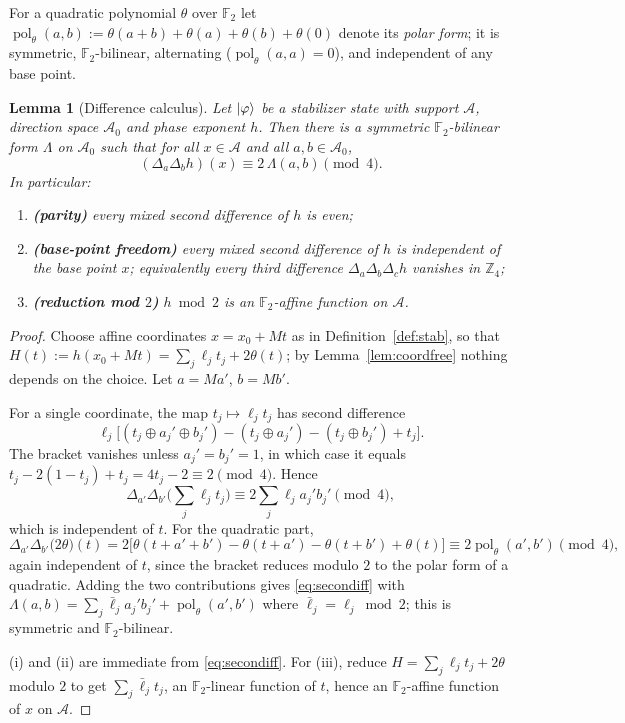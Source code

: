 \documentclass[11pt]{article}
\theoremstyle{plain}
\newtheorem{lemma}[theorem]{Lemma}
\theoremstyle{definition}
\newcommand{\F}{\mathbb{F}}
\newcommand{\Z}{\mathbb{Z}}
\DeclareMathOperator{\pol}{pol}
\begin{document}
For a quadratic polynomial $\theta$ over $\F_2$ let
$\pol_\theta(a,b):=\theta(a+b)+\theta(a)+\theta(b)+\theta(0)$ denote its
\emph{polar form}; it is symmetric, $\F_2$-bilinear, alternating
($\pol_\theta(a,a)=0$), and independent of any base point.

\begin{lemma}[Difference calculus]\label{lem:diff}
Let $\ket\varphi$ be a stabilizer state with support $\mathcal A$, direction space
$\mathcal A_0$ and phase exponent $h$. Then there is a symmetric $\F_2$-bilinear form
$\Lambda$ on $\mathcal A_0$ such that for all $x\in\mathcal A$ and all
$a,b\in\mathcal A_0$,
\begin{equation}\label{eq:secondiff}
(\Delta_a\Delta_bh)(x)\equiv 2\,\Lambda(a,b) \pmod 4 .
\end{equation}
In particular:
\begin{enumerate}[label=(\roman*)]
\item \textbf{(parity)} every mixed second difference of $h$ is even;
\item \textbf{(base-point freedom)} every mixed second difference of $h$ is independent
of the base point $x$; equivalently every third difference
$\Delta_a\Delta_b\Delta_ch$ vanishes in $\Z_4$;
\item \textbf{(reduction mod $2$)} $h\bmod2$ is an $\F_2$-affine function on $\mathcal A$.
\end{enumerate}
\end{lemma}

\begin{proof}
Choose affine coordinates $x=x_0+Mt$ as in Definition~\ref{def:stab}, so that
$H(t):=h(x_0+Mt)=\sum_j\ell_jt_j+2\theta(t)$; by Lemma~\ref{lem:coordfree} nothing
depends on the choice. Let $a=Ma'$, $b=Mb'$.

For a single coordinate, the map $t_j\mapsto \ell_jt_j$ has second difference
\[
\ell_j\big[(t_j\oplus a_j'\oplus b_j')-(t_j\oplus a_j')-(t_j\oplus b_j')+t_j\big].
\]
The bracket vanishes unless $a_j'=b_j'=1$, in which case it equals
$t_j-2(1-t_j)+t_j=4t_j-2\equiv2\pmod4$. Hence
\[
\Delta_{a'}\Delta_{b'}\Big(\sum_j\ell_jt_j\Big)\equiv 2\sum_j\ell_ja_j'b_j'\pmod4 ,
\]
which is independent of $t$. For the quadratic part,
\[
\Delta_{a'}\Delta_{b'}\big(2\theta\big)(t)=2\big[\theta(t+a'+b')-\theta(t+a')-\theta(t+b')+\theta(t)\big]
\equiv 2\pol_\theta(a',b')\pmod 4 ,
\]
again independent of $t$, since the bracket reduces modulo $2$ to the polar form of a
quadratic. Adding the two contributions gives \eqref{eq:secondiff} with
$\Lambda(a,b)=\sum_j\bar\ell_ja_j'b_j'+\pol_\theta(a',b')$ where
$\bar\ell_j=\ell_j\bmod2$; this is symmetric and $\F_2$-bilinear.

(i) and (ii) are immediate from \eqref{eq:secondiff}. For (iii), reduce
$H=\sum_j\ell_jt_j+2\theta$ modulo $2$ to get $\sum_j\bar\ell_jt_j$, an $\F_2$-linear
function of $t$, hence an $\F_2$-affine function of $x$ on $\mathcal A$.
\end{proof}
\end{document}
